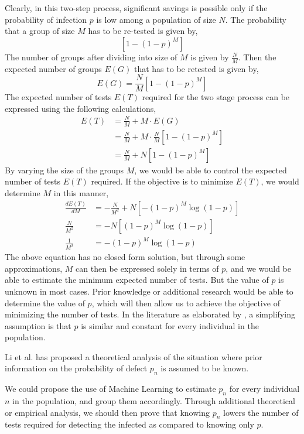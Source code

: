 \documentclass{sig-alternate}
\begin{document}
Clearly, in this two-step process, significant savings is possible only if the probability of infection $p$ is low among a population of size $N$. The probability that a group of size $M$ has to be re-tested is given by,
\[ \left[ 1 - (1-p)^M \right] \]
The number of groups after dividing into size of $M$ is given by $\frac{N}{M}$. Then the expected number of groups $E(G)$ that has to be retested is given by,
\[ E(G) = \frac{N}{M} \left[ 1 - (1-p)^M \right] \]
The expected number of tests $E(T)$ required for the two stage process can be expressed using the following calculations,
\begin{align*}
	E(T) &= \frac{N}{M} + M \cdot E(G) \\
	& = \frac{N}{M} + M \cdot \frac{N}{M} \left[ 1 - (1-p)^M \right] \\
	& = \frac{N}{M} + N \left[ 1 - (1-p)^M \right]
\end{align*}
By varying the size of the groups $M$, we would be able to control the expected number of tests $E(T)$ required. If the objective is to minimize $E(T)$, we would determine $M$ in this manner,
\begin{align*}
	\frac{d E(T)}{d M} &= - \frac{N}{M^2} + N \left[ - (1-p)^M \log(1-p) \right] \\
	\frac{N}{M^2} &= - N \left[ (1-p)^M \log(1-p) \right] \\
	\frac{1}{M^2} &= -(1-p)^M \log(1-p)
\end{align*}
The above equation has no closed form solution, but through some approximations, $M$ can then be expressed solely in terms of $p$, and we would be able to estimate the minimum expected number of tests.
But the value of $p$ is unknown in most cases. Prior knowledge or additional research would be able to determine the value of $p$, which will then allow us to achieve the objective of minimizing the number of tests. In the literature as elaborated by \cite{Dorfman1943,Mezard2008,Mezard2011}, a simplifying assumption is that $p$ is similar and constant for every individual in the population. 

Li et al. \cite{Li2014} has proposed a theoretical analysis of the situation where prior information on the probability of defect $p_n$ is assumed to be known.

We could propose the use of Machine Learning to estimate $p_n$ for every individual $n$ in the population, and group them accordingly. Through additional theoretical or empirical analysis, we should then prove that knowing $p_n$ lowers the number of tests required for detecting the infected as compared to knowing only $p$.
\end{document}
